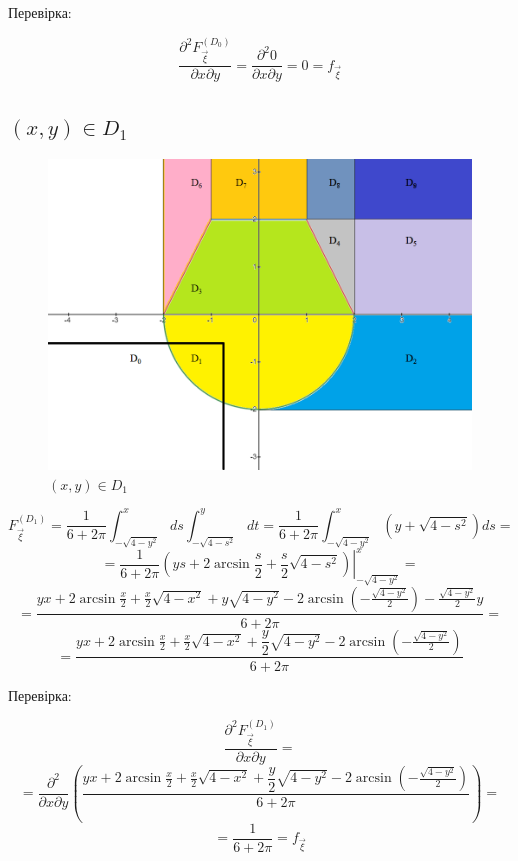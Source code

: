 \documentclass[14pt, a4paper, ukrainian]{extreport}
\begin{document}
	Перевірка: 
	
	$$\frac{\partial^2F_{\vec\xi}^{\left(D_0\right)}}{\partial x \partial y} = \frac{\partial^2 0 }{\partial x \partial y} = 0 = f_{\vec{\xi}}
	$$
	
	\subsection{$(x, y) \in D_1 $}
	
	\begin{figure}[H]
		\centering
		\includegraphics[width=\textwidth]{./Image/Im_12_D_1.png}
		\caption{$(x, y) \in D_1$}
		\label{im:D_1}
	\end{figure}
	
	$$ F_{\vec \xi}^{\left(D_1\right)} = \frac{1}{6 + 2\pi}\int_{-\sqrt{4-y^2}}^{x}ds\int_{-\sqrt{4-s^2}}^{y}dt = \frac{1}{6+2\pi}\int_{-\sqrt{4-y^2}}^{x}(y + \sqrt{4-s^2})ds = 
	$$ 
	$$ = \frac{1}{6+2\pi}\left.\left(ys + 2\arcsin\frac{s}{2} + \frac{s}{2}\sqrt{4-s^2}\right)\right|_{-\sqrt{4-y^2}}^x =
	$$
	$$ = \dfrac{yx + 2\arcsin\frac{x}{2} + \frac{x}{2}\sqrt{4-x^2} + y\sqrt{4-y^2} - 2\arcsin{\left(-\frac{\sqrt{4-y^2}}{2}\right)} - \frac{\sqrt{4-y^2}}{2}y}{6+2\pi} = 
	$$
	$$ = \dfrac{yx + 2\arcsin\frac{x}{2} + \frac{x}{2}\sqrt{4-x^2} + \dfrac{y}{2}\sqrt{4-y^2} - 2\arcsin{\left(-\frac{\sqrt{4-y^2}}{2}\right)}}{6+2\pi}
	$$
	
	Перевірка: 
	
	$$\frac{\partial^2F_{\vec\xi}^{\left(D_1\right)}}{\partial x \partial y} = 
	$$
	$$ = \frac{\partial^2}{\partial x \partial y}\left(\dfrac{yx + 2\arcsin\frac{x}{2} + \frac{x}{2}\sqrt{4-x^2} + \dfrac{y}{2}\sqrt{4-y^2} - 2\arcsin{\left(-\frac{\sqrt{4-y^2}}{2}\right)}}{6+2\pi}\right) =
	$$
	$$	= \frac{1}{6+2\pi} = f_{\vec{\xi}}
	$$
	
\end{document}
